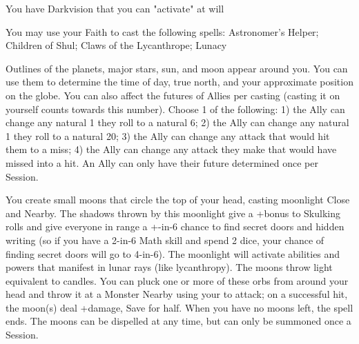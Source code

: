 {\GOD[
Name=Shul,
Link=small-god-shul,
GodOf=Seraph of Moonlight,
Holy=3 pearl earrings hung from either ear
]


You have Darkvision that you can "activate" at will


You may use your Faith to cast the following spells: Astronomer's Helper; Children of Shul; Claws of the Lycanthrope; Lunacy

\LITURGY [
  Name= Astrologer's Helper,
  Link= shul-liturgy-astrologers-helper,
  Paradigm= Prophesy ,
  Save=  N ,
  Duration= Session ,
  Counter=  n/a  ,
  Keywords= Splittable ,
  Target=   Self / Close creature(s)
]



Outlines of the planets, major stars, sun, and moon appear around you. You can use them to determine the time of day, true north, and your approximate position on the globe. You can also affect the futures of \DICE Allies per casting (casting it on yourself counts towards this number). Choose 1 of the following:  1)  the Ally can change any natural 1 they roll to a natural 6; 2) the Ally can change any natural 1 they roll to a natural 20; 3) the Ally can change any attack that would hit them to a miss; 4) the Ally can change any attack they make that would have missed into a hit.  An Ally can only have their future determined once per Session.

\LITURGY [
  Name= Children of Shul,
  Link=shul-liturgy-children-of-shul,
  Paradigm= Prophesy ,
  Save=  Y (half) ,
  Duration= Session ,
  Counter=  n/a  ,
  Keywords= None ,
  Target=   Self
]



You create \DICE small moons that circle the top of your head, casting moonlight Close and Nearby.  The shadows thrown by this moonlight give a +\DICE bonus to Skulking rolls and give everyone in range a +\DICE-in-6 chance to find secret doors and hidden writing (so if you have a 2-in-6 Math skill and spend 2 dice, your chance of finding secret doors will go to 4-in-6). The moonlight will activate abilities and powers that manifest in lunar rays (like lycanthropy).  The moons throw light equivalent to \DICE candles.
You can pluck one or more of these orbs from around your head and throw it at a Monster Nearby using your \FOC to attack; on a successful hit, the moon(s) deal \SUMDICE+\DICE damage, Save for half.  When you have no moons left, the spell ends.
The moons can be dispelled at any time, but can only be summoned once a Session.

}
